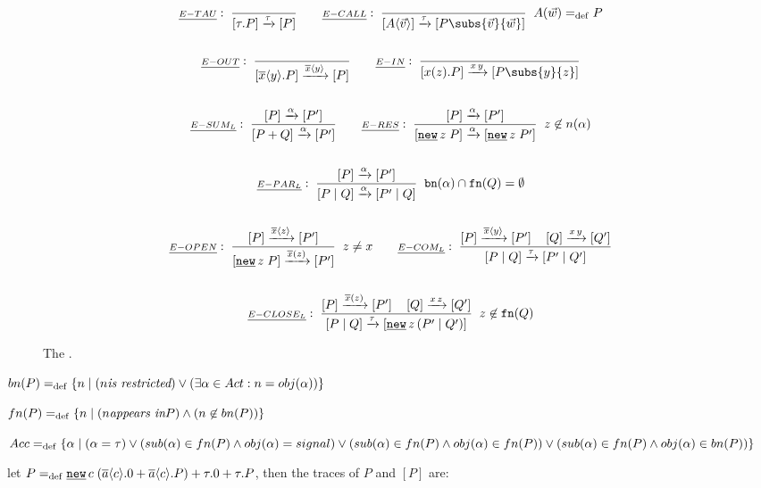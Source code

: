 \begin{figure}[h!]
\begin{gather*}
\kalRule{E-TAU}{}{}{\ec{\tau.P} \transs{\tau} \ec{P}} \quad\quad \kalRule[\procdef{A}{\parl{w}}\define P]{E-CALL}{}{}{\ec{\proccall{A}{\parl{v}}} \tautrans \ec{P\subs{\parl{v}}{\parl{w}}}} \\\\
\kalRule{E-OUT}{}{}{\ec{\out{x}{y}.P} \transs{\out{x}{y}} \ec{P}} \quad\quad \kalRule{E-IN}{}{}{\ec{\inp{x}{z}.P} \intrans{x}{y} \ec{P\subs{y}{z}}} \\\\
\kalRule{E-SUM_L}{}{\ec{P} \transs{\alpha} \ec{P'}}{\ec{P+Q} \transs{\alpha} \ec{P'}} \quad\quad \kalRule[z\nin n(\alpha)]{E-RES}{}{\ec{P} \transs{\alpha} \ec{P'}}{\ec{\procres{z}{P}} \transs{\alpha} \ec{\procres{z}{P'}}} \\\\
\kalRule[\bn{\alpha}\cap\fn{Q}=\emptyset]{E-PAR_L}{}{\ec{P} \transs{\alpha} \ec{P'}}{\ec{\procpar{P}{Q}} \transs{\alpha} \ec{\procpar{P'}{Q}}} \\\\
\kalRule[z\neq x]{E-OPEN}{}{\ec{P} \outtrans{x}{z} \ec{P'}}{\ec{\procres{z}{P}} \bouttrans{x}{z} \ec{P'}} \quad\quad \kalRule{E-COM_L}{\ec{P} \outtrans{x}{y} \ec{P'}}{\ec{Q} \intrans{x}{y} \ec{Q'}}{\ec{\procpar{P}{Q}} \tautrans \ec{\procpar{P'}{Q'}}}\\\\
\kalRule[z\nin\fn{Q}]{E-CLOSE_L}{\ec{P} \bouttrans{x}{z} \ec{P'}}{\ec{Q} \intrans{x}{z} \ec{Q'}}{\ec{\procpar{P}{Q}} \tautrans \ec{\procres[a]{z}{\procpar{P'}{Q'}}}}
\end{gather*}
\caption{The  \cite{sangiorgi}.}
\label{fig_ts_early}
\end{figure}


$bn(P) =_{\mathrm{def}} \{n \mid (n \textit{is restricted}) \vee (\exists \alpha \in Act: n = obj(\alpha))\}$

$fn(P) =_{\mathrm{def}} \{n \mid (n \textit{appears in} P) \wedge (n \not\in bn(P))\}$

$Acc =_{\mathrm{def}} \{\alpha \mid (\alpha = \tau) \vee (sub(\alpha) \in fn(P) \wedge obj(\alpha)=signal) \vee (sub(\alpha) \in fn(P) \wedge obj(\alpha) \in fn(P)) \vee (sub(\alpha) \in fn(P) \wedge obj(\alpha) \in bn(P))\}$


let $P\define\procres{c}{(\out{a}{c}.0 + \out{a}{c}.P)} +\tau.0 + \tau.P$, then the traces of $P$ and $[P]$ are:


